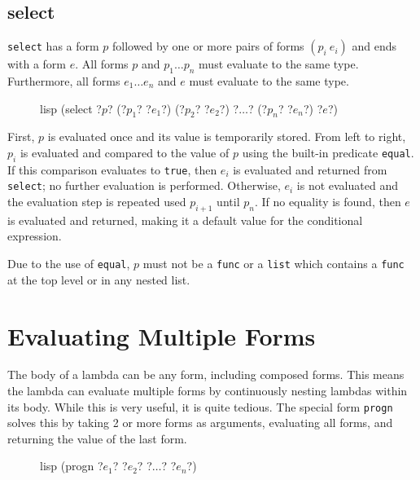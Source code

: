 \documentclass[a4paper, 12pt]{article}
\begin{document}

\subsection{select}

\texttt{select} has a form $p$ followed by one or more pairs of forms $(p_i\ e_i)$ and ends with a form $e$. All forms $p$ and $p_1 \ldots p_n$ must evaluate to the same type. Furthermore, all forms $e_1 \ldots e_n$ and $e$ must evaluate to the same type.

\begin{figure}[htp]
    \centering
    \begin{cminted}[autogobble=true, escapeinside=??]{lisp}
        (select ?$p$? (?$p_1$? ?$e_1$?) (?$p_2$? ?$e_2$?) ?$\ldots$? (?$p_n$? ?$e_n$?) ?$e$?)
    \end{cminted}
    \captionsetup[figure]{font=small}
\end{figure}

First, $p$ is evaluated once and its value is temporarily stored. From left to right, $p_i$ is evaluated and compared to the value of $p$ using the built-in predicate \texttt{equal}. If this comparison evaluates to \texttt{true}, then $e_i$ is evaluated and returned from \texttt{select}; no further evaluation is performed. Otherwise, $e_i$ is not evaluated and the evaluation step is repeated used $p_{i + 1}$ until $p_n$. If no equality is found, then $e$ is evaluated and returned, making it a default value for the conditional expression.

Due to the use of \texttt{equal}, $p$ must not be a \texttt{func} or a \texttt{list} which contains a \texttt{func} at the top level or in any nested list.

\section{Evaluating Multiple Forms}
The body of a lambda can be any form, including composed forms. This means the lambda can evaluate multiple forms by continuously nesting lambdas within its body. While this is very useful, it is quite tedious. The special form \texttt{progn} solves this by taking 2 or more forms as arguments, evaluating all forms, and returning the value of the last form.

\begin{figure}[htp]
    \centering
    \begin{cminted}[autogobble=true, escapeinside=??]{lisp}
        (progn ?$e_1$? ?$e_2$? ?$\ldots$? ?$e_n$?)
    \end{cminted}
    \captionsetup[figure]{font=small}
\end{figure}
\end{document}

